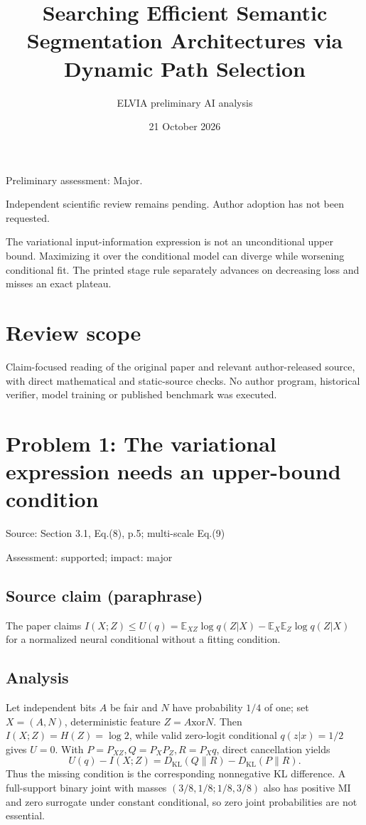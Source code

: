 \documentclass[11pt]{article}
\begin{document}
\title{Searching Efficient Semantic Segmentation Architectures via Dynamic Path Selection}

\author{ELVIA preliminary AI analysis}\date{21 October 2026}\maketitle

Preliminary assessment: Major.\par

Independent scientific review remains pending. Author adoption has not been requested.

The variational input-information expression is not an unconditional upper bound. Maximizing it over the conditional model can diverge while worsening conditional fit. The printed stage rule separately advances on decreasing loss and misses an exact plateau.

\section*{Review scope}

Claim-focused reading of the original paper and relevant author-released source, with direct mathematical and static-source checks. No author program, historical verifier, model training or published benchmark was executed.

\section*{Problem 1: The variational expression needs an upper-bound condition}

Source: Section 3.1, Eq.(8), p.5; multi-scale Eq.(9)

Assessment: supported; impact: major

\subsection*{Source claim (paraphrase)}

The paper claims \(I(X;Z)\le U(q)=\mathbb E_{XZ}\log q(Z|X)-\mathbb E_X\mathbb E_Z\log q(Z|X)\) for a normalized neural conditional without a fitting condition.

\subsection*{Analysis}

Let independent bits \(A\) be fair and \(N\) have probability \(1/4\) of one; set \(X=(A,N)\), deterministic feature \(Z=A\mathbin{\mathrm{xor}}N\). Then \(I(X;Z)=H(Z)=\log2\), while valid zero-logit conditional \(q(z|x)=1/2\) gives \(U=0\). With \(P=P_{XZ},Q=P_XP_Z,R=P_Xq\), direct cancellation yields \[U(q)-I(X;Z)=D_{\mathrm{KL}}(Q\|R)-D_{\mathrm{KL}}(P\|R).\] Thus the missing condition is the corresponding nonnegative KL difference. A full-support binary joint with masses \((3/8,1/8;1/8,3/8)\) also has positive MI and zero surrogate under constant conditional, so zero joint probabilities are not essential.
\end{document}
